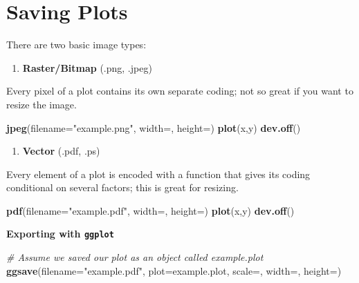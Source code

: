 \documentclass[
]{book}
\newenvironment{Shaded}{\begin{snugshade}}{\end{snugshade}}
\newcommand{\CommentTok}[1]{\textcolor[rgb]{0.56,0.35,0.01}{\textit{#1}}}
\newcommand{\DataTypeTok}[1]{\textcolor[rgb]{0.13,0.29,0.53}{#1}}
\newcommand{\KeywordTok}[1]{\textcolor[rgb]{0.13,0.29,0.53}{\textbf{#1}}}
\newcommand{\NormalTok}[1]{#1}
\newcommand{\StringTok}[1]{\textcolor[rgb]{0.31,0.60,0.02}{#1}}
\providecommand{\tightlist}{%
  \setlength{\itemsep}{0pt}\setlength{\parskip}{0pt}}
\begin{document}
\hypertarget{saving-plots}{%
\section{Saving Plots}\label{saving-plots}}

There are two basic image types:

\begin{enumerate}
\def\labelenumi{\arabic{enumi})}
\tightlist
\item
  \textbf{Raster/Bitmap} (.png, .jpeg)
\end{enumerate}

Every pixel of a plot contains its own separate coding; not so great if you want to resize the image.

\begin{Shaded}
\begin{Highlighting}[]
\KeywordTok{jpeg}\NormalTok{(}\DataTypeTok{filename=}\StringTok{"example.png"}\NormalTok{, }\DataTypeTok{width=}\NormalTok{, }\DataTypeTok{height=}\NormalTok{)}
\KeywordTok{plot}\NormalTok{(x,y)}
\KeywordTok{dev.off}\NormalTok{()}
\end{Highlighting}
\end{Shaded}

\begin{enumerate}
\def\labelenumi{\arabic{enumi})}
\setcounter{enumi}{1}
\tightlist
\item
  \textbf{Vector} (.pdf, .ps)
\end{enumerate}

Every element of a plot is encoded with a function that gives its coding conditional on several factors; this is great for resizing.

\begin{Shaded}
\begin{Highlighting}[]
\KeywordTok{pdf}\NormalTok{(}\DataTypeTok{filename=}\StringTok{"example.pdf"}\NormalTok{, }\DataTypeTok{width=}\NormalTok{, }\DataTypeTok{height=}\NormalTok{)}
\KeywordTok{plot}\NormalTok{(x,y)}
\KeywordTok{dev.off}\NormalTok{()}
\end{Highlighting}
\end{Shaded}

\textbf{Exporting with \texttt{ggplot}}

\begin{Shaded}
\begin{Highlighting}[]
\CommentTok{# Assume we saved our plot as an object called example.plot}
\KeywordTok{ggsave}\NormalTok{(}\DataTypeTok{filename=}\StringTok{"example.pdf"}\NormalTok{, }\DataTypeTok{plot=}\NormalTok{example.plot, }\DataTypeTok{scale=}\NormalTok{, }\DataTypeTok{width=}\NormalTok{, }\DataTypeTok{height=}\NormalTok{)}
\end{Highlighting}
\end{Shaded}
\end{document}
